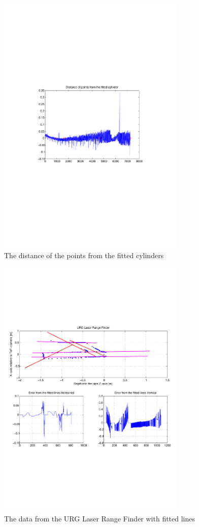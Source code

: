 \begin{figure}[htbp]
    \centering
    \includegraphics[width=0.8\textwidth]{pics/longpipe-tof-dist}
    \caption{The distance of the points from the fitted cylinders}
    \label{chap7:fig-longpipe-tof-dist}
\end{figure}
\begin{figure}[htbp]
    \centering
    \includegraphics[width=0.8\textwidth]{pics/longpipe-urg-2d}
    \caption{The data from the URG Laser Range Finder with fitted lines}
    \label{chap7:fig-longpipe-urg-2d}
\end{figure}


